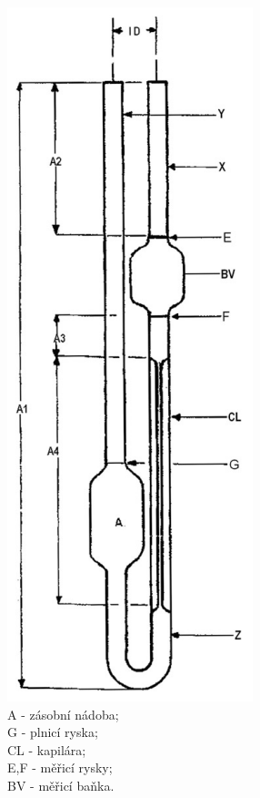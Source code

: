 \documentclass[12pt]{article}
\begin{document}
\begin{figure}
\begin{subfigure}[b]{.3\textwidth}
        \includegraphics[height=0.4\paperheight]{figures/Ostwald_pruhledny.png}
        \caption{A - zásobní nádoba;\\G - plnicí ryska;\\CL - kapilára;\\E,F - měřicí rysky;\\BV - měřicí baňka.}
        \label{sfig:Ostwald_normalni}
    \end{subfigure}
    \begin{subfigure}[b]{.3\textwidth}
        \captionsetup{justification=centering}

\end{subfigure}
\end{figure}
\end{document}
